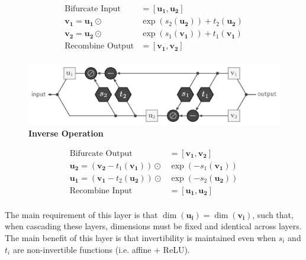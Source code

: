 \documentclass[landscape,paperwidth=40in,paperheight=30in,margin=1in]{baposter}
\begin{document}
\begin{poster}
{\begin{multicols}{2}
	\small
	\begin{equation*}
	\begin{aligned}
		\text{Bifurcate Input} &= [\bm{u_1}, \bm{u_2}]\\
		\bm{v_1} = \bm{u_1} \odot &\exp(s_2(\bm{u_2})) + t_2(\bm{u_2})\\
		\bm{v_2} = \bm{u_2} \odot &\exp(s_1(\bm{v_1})) + t_1(\bm{v_1})\\
		 \text{Recombine Output} &= [\bm{v_1}, \bm{v_2}]\\
	\end{aligned}
	\end{equation*}
	\begin{figure}[H]
		\caption{\textbf{Inverse Operation} \cite{ref:inn_fig}}
		\vspace{-10pt}
		\includegraphics[width=\columnwidth]{images/inn_backward.png}
	\end{figure}
	\vspace{-30pt}
	\small
	\begin{equation*}
	\begin{aligned}
		\text{Bifurcate Output} &= [\bm{v_1}, \bm{v_2}]\\
		\bm{u_2} = (\bm{v_2} - t_1(\bm{v_1})) \odot &\exp(-s_1(\bm{v_1}))\\
		\bm{u_1} = (\bm{v_1} - t_2(\bm{u_2})) \odot &\exp(-s_2(\bm{u_2}))\\
		\text{Recombine Input} &= [\bm{u_1}, \bm{u_2}]\\
	\end{aligned}
	\end{equation*}
	\end{multicols}
	\vspace{-10pt}
	\noindent The main requirement of this layer is that $\dim(\bm{u_i}) = \dim(\bm{v_i})$, such that, when cascading these layers, dimensions must be fixed and identical across layers. The main benefit of this layer is that invertibility is maintained even when $s_i$ and $t_i$ are non-invertible functions (i.e. affine + ReLU).
  }



\end{poster}
\end{document}
